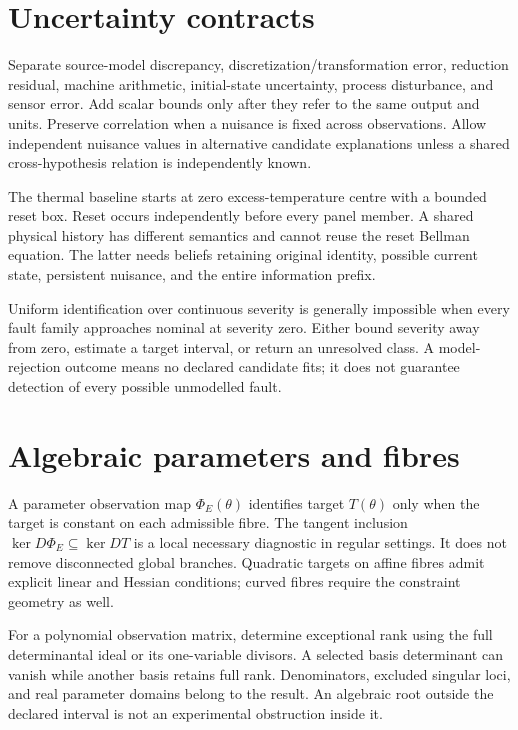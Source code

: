 \documentclass[
  11pt,
  a4paper,
]{report}
\begin{document}
\hypertarget{uncertainty-contracts}{%
\section{Uncertainty contracts}\label{uncertainty-contracts}}

Separate source-model discrepancy, discretization/transformation error,
reduction residual, machine arithmetic, initial-state uncertainty,
process disturbance, and sensor error. Add scalar bounds only after they
refer to the same output and units. Preserve correlation when a nuisance
is fixed across observations. Allow independent nuisance values in
alternative candidate explanations unless a shared cross-hypothesis
relation is independently known.

The thermal baseline starts at zero excess-temperature centre with a
bounded reset box. Reset occurs independently before every panel member.
A shared physical history has different semantics and cannot reuse the
reset Bellman equation. The latter needs beliefs retaining original
identity, possible current state, persistent nuisance, and the entire
information prefix.

Uniform identification over continuous severity is generally impossible
when every fault family approaches nominal at severity zero. Either
bound severity away from zero, estimate a target interval, or return an
unresolved class. A model-rejection outcome means no declared candidate
fits; it does not guarantee detection of every possible unmodelled
fault.

\hypertarget{algebraic-parameters-and-fibres}{%
\section{Algebraic parameters and
fibres}\label{algebraic-parameters-and-fibres}}

A parameter observation map \(\Phi_E(\theta)\) identifies target
\(T(\theta)\) only when the target is constant on each admissible fibre.
The tangent inclusion \(\ker D\Phi_E\subseteq\ker DT\) is a local
necessary diagnostic in regular settings. It does not remove
disconnected global branches. Quadratic targets on affine fibres admit
explicit linear and Hessian conditions; curved fibres require the
constraint geometry as well.

For a polynomial observation matrix, determine exceptional rank using
the full determinantal ideal or its one-variable divisors. A selected
basis determinant can vanish while another basis retains full rank.
Denominators, excluded singular loci, and real parameter domains belong
to the result. An algebraic root outside the declared interval is not an
experimental obstruction inside it.
\end{document}
